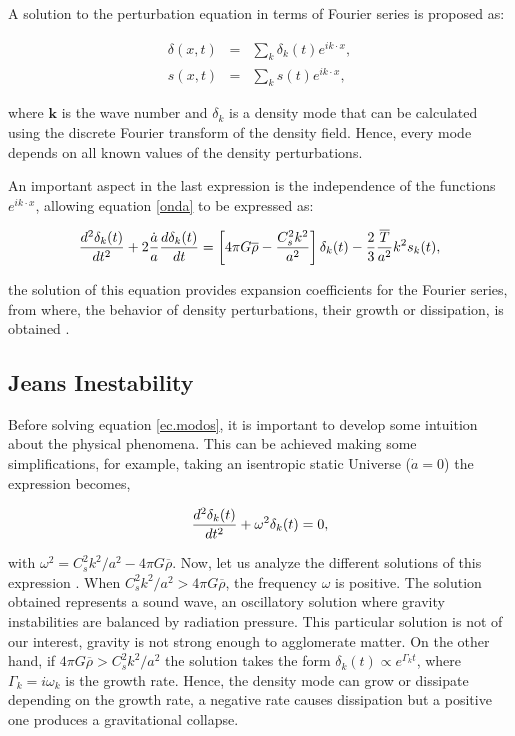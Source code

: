 A solution to the perturbation equation in terms of Fourier series is proposed as:

\begin{eqnarray}
\delta(x,t) &=& \sum_k \delta_k(t)e^{ik\cdot x}, \nonumber\\
s(x,t) &=& \sum_k s(t)e^{ik\cdot x}, \nonumber
\end{eqnarray}

where $\textbf{k}$ is the wave number and $\delta_k$ is 
a density mode that can be calculated using the discrete Fourier transform
of the density field. Hence, every mode depends on all known values
of the density perturbations. 

An important aspect in the last expression is the independence of the 
functions $e^{ik\cdot x}$, allowing equation \ref{onda} to be expressed as: 

\begin{equation}
\frac{d^2\delta_k(t)}{dt^2}+2\frac{\dot{a}}{a}\frac{d \delta_k(t)}{d t} = 
\left[4\pi G\overline{\rho}-\frac{C_s^2 k^2}{a^2}\right]\delta_k(t)
-\frac{2}{3}\frac{\overline{T}}{a^2}k^2s_k(t),
\label{ec.modos}
\end{equation}

the solution of this equation provides expansion coefficients for the Fourier series,
from where, the behavior of density perturbations, their growth or 
dissipation, is obtained \cite{padma}. 

\subsection{ Jeans Inestability}

Before solving equation \ref{ec.modos}, it is important to develop
some intuition about the	 physical phenomena. This can be achieved making some 
simplifications, for example, taking an isentropic static Universe ($\dot{a}=0$)
the expression becomes,

\begin{equation}
\frac{d^2\delta_k(t)}{dt^2} + \omega^2\delta_k(t) = 0 ,
\label{JI}
\end{equation} 

with $\omega^2 = C_s^2k^2/a^2-4\pi G\overline{\rho}$. Now, let us analyze
the different solutions of this expression \cite{Longair}. When $C_s^2k^2/a^2>4\pi G\overline{\rho}$, 
the frequency $\omega$ is positive. The solution obtained represents a sound wave, an oscillatory solution where 
gravity instabilities are balanced by radiation pressure. This particular solution is not of our interest, gravity is not strong enough to
agglomerate matter.
On the other hand, if $4\pi G\overline{\rho}>C_s^2k^2/a^2$ the solution takes the form 
$\delta_k(t)\propto e^{\Gamma_k t}$, where $\Gamma_k=i\omega_k$ is the growth rate. 
Hence, the density mode can grow or dissipate depending on the growth rate, a negative 
rate causes dissipation but a positive one produces a gravitational collapse.

